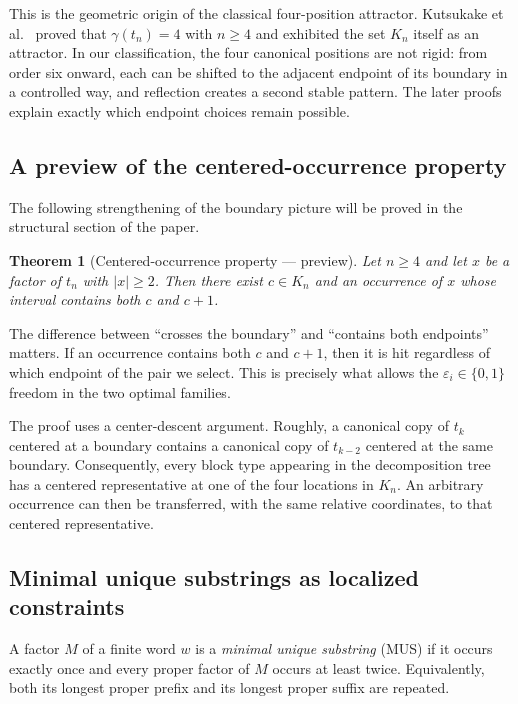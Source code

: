 \documentclass[11pt,a4paper]{article}
\newtheorem{theorem}{Theorem}[section]
\theoremstyle{definition}\newtheorem{definition}[theorem]{Definition}
\theoremstyle{remark}\newtheorem{remark}[theorem]{Remark}
\begin{document}
This is the geometric origin of the classical four-position attractor. Kutsukake et al.~\cite{Kutsukake2020} proved that
$
\gamma(t_n)=4$
with
$
n\ge4
$
and exhibited the set $K_n$ itself as an attractor. In our classification, the four canonical positions are not rigid: from order six onward, each can be shifted to the adjacent endpoint of its boundary in a controlled way, and reflection creates a second stable pattern. The later proofs explain exactly which endpoint choices remain possible.

\subsection{A preview of the centered-occurrence property}
The following strengthening of the boundary picture will be proved in the structural section of the paper.

\begin{theorem}[Centered-occurrence property --- preview]
\label{thm:centered-preview}
Let $n\ge4$ and let $x$ be a factor of $t_n$ with $|x|\ge2$. Then there exist $c\in K_n$ and an occurrence of $x$ whose interval contains both $c$ and $c+1$.
\end{theorem}

The difference between ``crosses the boundary'' and ``contains both endpoints'' matters. If an occurrence contains both $c$ and $c+1$, then it is hit regardless of which endpoint of the pair we select. This is precisely what allows the $\varepsilon_i\in\{0,1\}$ freedom in the two optimal families.

The proof uses a center-descent argument. Roughly, a canonical copy of $t_k$ centered at a boundary contains a canonical copy of $t_{k-2}$ centered at the same boundary. Consequently, every block type appearing in the decomposition tree has a centered representative at one of the four locations in $K_n$. An arbitrary occurrence can then be transferred, with the same relative coordinates, to that centered representative.

\subsection{Minimal unique substrings as localized constraints}
A factor $M$ of a finite word $w$ is a \emph{minimal unique substring} (MUS) if it occurs exactly once and every proper factor of $M$ occurs at least twice. Equivalently, both its longest proper prefix and its longest proper suffix are repeated.
\end{document}
